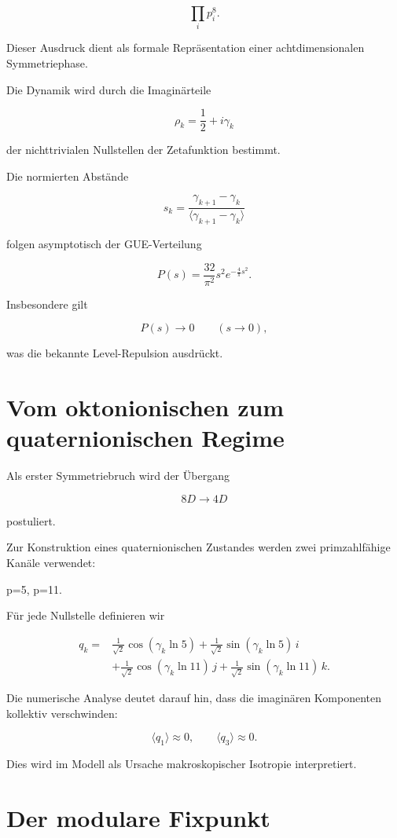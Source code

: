 \documentclass[11pt,a4paper]{article}
\begin{document}
\[
\prod_i p_i^8.
\]

Dieser Ausdruck dient als formale Repräsentation einer achtdimensionalen Symmetriephase.

Die Dynamik wird durch die Imaginärteile

\[
\rho_k=\frac12+i\gamma_k
\]

der nichttrivialen Nullstellen der Zetafunktion bestimmt.

Die normierten Abstände

\[
s_k=\frac{\gamma_{k+1}-\gamma_k}{\langle \gamma_{k+1}-\gamma_k\rangle}
\]

folgen asymptotisch der GUE-Verteilung

\[
P(s)=\frac{32}{\pi^2}s^2 e^{-\frac{4}{\pi}s^2}.
\]

Insbesondere gilt

\[
P(s)\rightarrow 0 \qquad (s\rightarrow 0),
\]

was die bekannte Level-Repulsion ausdrückt.

\section{Vom oktonionischen zum quaternionischen Regime}

Als erster Symmetriebruch wird der Übergang

\[
8D \longrightarrow 4D
\]

postuliert.

Zur Konstruktion eines quaternionischen Zustandes werden zwei primzahlfähige Kanäle verwendet:

p=5,
\qquad
p=11.

Für jede Nullstelle definieren wir

\[
\begin{aligned}
q_k={}&\frac{1}{\sqrt2}\cos(\gamma_k\ln 5)
+\frac{1}{\sqrt2}\sin(\gamma_k\ln 5)\,i \\
&+\frac{1}{\sqrt2}\cos(\gamma_k\ln 11)\,j
+\frac{1}{\sqrt2}\sin(\gamma_k\ln 11)\,k.
\end{aligned}
\]

Die numerische Analyse deutet darauf hin, dass die imaginären Komponenten kollektiv verschwinden:

\[
\langle q_1\rangle \approx 0,\qquad
\langle q_3\rangle \approx 0.
\]

Dies wird im Modell als Ursache makroskopischer Isotropie interpretiert.

\section{Der modulare Fixpunkt}
\end{document}
